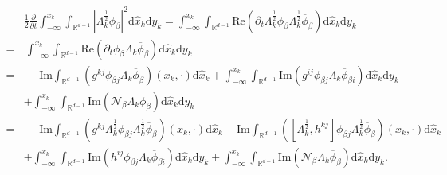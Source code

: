 \documentclass[10pt,twoside,a4paper]{article}
\numberwithin{equation}{section}\allowdisplaybreaks
\begin{document}
\begin{align} \label{Hs0_bec}	
	&	\frac 12 \frac{\partial }{\partial t} \int_{-\infty}^{x_k} \int_{\mathbb{R}^{d-1}} \left| \Lambda_k^{\frac 12} \phi_{\beta } \right|^2\mathrm{d} \hat{x}_k \mathrm{d} y_k=\int_{-\infty}^{x_k} \int_{\mathbb{R}^{d-1}} \mathrm{Re}\left(   \partial_t \Lambda_k^{\frac 12} \phi_{\beta }  \Lambda_k^{\frac 12}\overline{\phi}_{\beta }  \right) \mathrm{d} \hat{x}_k \mathrm{d} y_k\nonumber\\
	=&\,\int_{-\infty}^{x_k} \int_{\mathbb{R}^{d-1}}  \mathrm{Re}\left(   \partial_t \phi_{\beta }  \Lambda_k\overline{\phi}_{\beta } \right) \mathrm{d} \hat{x}_k \mathrm{d} y_k\\
	=&\, -\mathrm{Im}	\int_{\mathbb{R}^{d-1}} \left(   g^{kj} \phi_{\beta j} \Lambda_k\overline{\phi}_{\beta }\right) (x_k,\cdot) \mathrm{d} \hat{x}_k+	\int_{-\infty}^{x_k} \int_{\mathbb{R}^{d-1}}   \mathrm{Im} \left(  g^{ij} \phi_{\beta j}\Lambda_k\overline{\phi}_{\beta i}\right)\mathrm{d} \hat{x}_k \mathrm{d} y_k\nonumber \\
	&+\int_{-\infty}^{x_k} \int_{\mathbb{R}^{d-1}}  \mathrm{Im} \left(  \mathcal{N}_\beta \Lambda_k\overline{\phi}_{\beta }\right)\mathrm{d} \hat{x}_k \mathrm{d} y_k\nonumber\\
	=&\, -\mathrm{Im}	\int_{\mathbb{R}^{d-1}} \left(   g^{kj} \Lambda_k^{\frac 12}\phi_{\beta j} \Lambda_k^{\frac 12}\overline{\phi}_{\beta }\right) (x_k,\cdot) \mathrm{d} \hat{x}_k-\mathrm{Im}	\int_{\mathbb{R}^{d-1}} \left( \left[\Lambda_k^{\frac12},h^{kj}\right]\phi_{\beta j}\Lambda_k^{\frac 12}\overline{\phi}_{\beta }\right) (x_k,\cdot) \mathrm{d} \hat{x}_k \nonumber \\
	&+	\int_{-\infty}^{x_k} \int_{\mathbb{R}^{d-1}}   \mathrm{Im} \left(  h^{ij} \phi_{\beta j}\Lambda_k\overline{\phi}_{\beta i}\right)\mathrm{d} \hat{x}_k \mathrm{d} y_k+\int_{-\infty}^{x_k} \int_{\mathbb{R}^{d-1}}  \mathrm{Im} \left(  \mathcal{N}_\beta \Lambda_k\overline{\phi}_{\beta }\right)\mathrm{d} \hat{x}_k \mathrm{d} y_k.\nonumber
\end{align}
\end{document}
